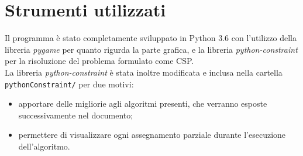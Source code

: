 \section{Strumenti utilizzati}
Il programma è stato completamente sviluppato in Python 3.6 con l'utilizzo della libreria \textit{pygame} per quanto rigurda la parte grafica, e la libreria \textit{python-constraint} per la risoluzione del problema formulato come CSP. \\
La libreria \textit{python-constraint} è stata inoltre modificata e inclusa nella cartella \texttt{pythonConstraint/} per due motivi:
\begin{itemize}
	\item apportare delle migliorie agli algoritmi presenti, che verranno esposte successivamente nel documento;
	\item permettere di visualizzare ogni assegnamento parziale durante l'esecuzione dell'algoritmo.
\end{itemize}  

